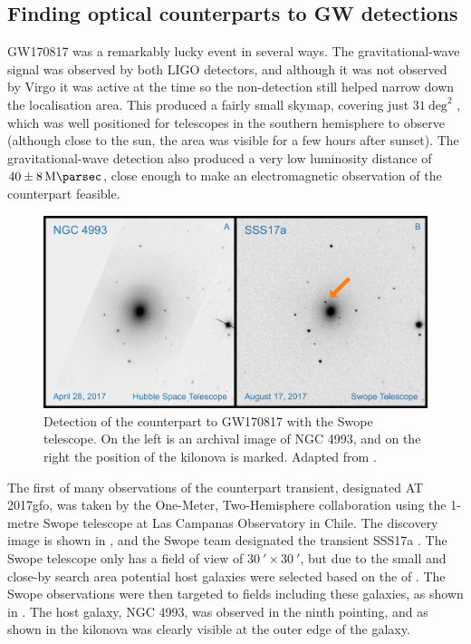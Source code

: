 \subsection{Finding optical counterparts to GW detections}
\label{sec:followup}
\begin{colsection}

GW170817 was a remarkably lucky event in several ways. The gravitational-wave signal was observed by both LIGO detectors, and although it was not observed by Virgo it was active at the time so the non-detection still helped narrow down the localisation area. This produced a fairly small skymap, covering just $31~\text{deg}^2$ \citep[see ]{GW170817}, which was well positioned for telescopes in the southern hemisphere to observe (although close to the sun, the area was visible for a few hours after sunset). The gravitational-wave detection also produced a very low luminosity distance of $40\pm\SI{8}{\mega\parsec}$, close enough to make an electromagnetic observation of the counterpart feasible.

\newpage

\begin{figure}[t]
    \begin{center}
        \includegraphics[width=0.8\linewidth]{images/sss17a.pdf}
    \end{center}
    \caption[Detection of the counterpart to GW170817]{
        Detection of the counterpart to GW170817 with the Swope telescope. On the left is an archival image of NGC 4993, and on the right the position of the kilonova is marked. Adapted from \citet{GW170817_Swope}.
        }\label{fig:sss17a}
\end{figure}

The first of many observations of the counterpart transient, designated AT 2017gfo, was taken by the One-Meter, Two-Hemisphere collaboration using the 1-metre Swope telescope at Las Campanas Observatory in Chile. The discovery image is shown in , and the Swope team designated the transient SSS17a \citep{GW170817_Swope}. The Swope telescope only has a field of view of $\SI{30}{\arcmin}\times\SI{30}{\arcmin}$, but due to the small and close-by search area potential host galaxies were selected based on the  of \citet{GWGC}. The Swope observations were then targeted to fields including these galaxies, as shown in . The host galaxy, NGC 4993, was observed in the ninth pointing, and as shown in  the kilonova was clearly visible at the outer edge of the galaxy.


\end{colsection}
